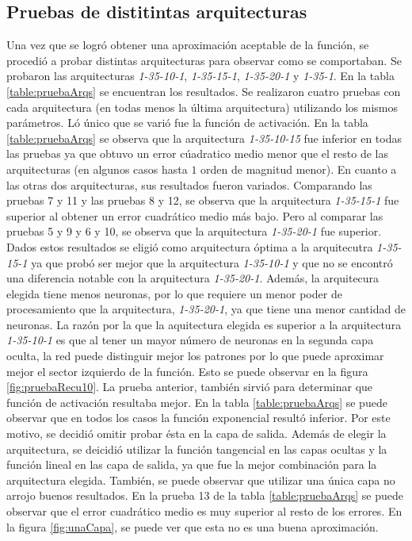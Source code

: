 \documentclass[11pt,a4paper]{article}
\begin{document}
\subsection{Pruebas de distitintas arquitecturas}


Una vez que se logró obtener una aproximación aceptable de la función, se procedió a probar distintas arquitecturas para observar como se comportaban. Se probaron las arquitecturas \emph{1-35-10-1}, \emph{1-35-15-1}, \emph{1-35-20-1} y \emph{1-35-1}. En la tabla \ref{table:pruebaArqs} se encuentran los resultados. Se realizaron cuatro pruebas con cada arquitectura (en todas menos la última arquitectura) utilizando los mismos parámetros. Ló único que se varió fue la función de activación. En la tabla \ref{table:pruebaArqs} se observa que la arquitectura \emph{1-35-10-15} fue inferior en todas las pruebas ya que obtuvo un error cúadratico medio menor que el resto de las arquitecturas (en algunos casos hasta $1$ orden de magnitud menor). En cuanto a las otras dos arquitecturas, sus resultados fueron variados. Comparando las pruebas 7 y 11 y las pruebas 8 y 12, se observa que la arquitectura \emph{1-35-15-1} fue superior al obtener un error cuadrático medio más bajo. Pero al comparar las pruebas 5 y 9 y 6 y 10, se observa que la arquitectura \emph{1-35-20-1} fue superior. Dados estos resultados se eligió como arquitectura óptima a la arquitecutra \emph{1-35-15-1} ya que probó ser mejor que la arquitectura \emph{1-35-10-1} y que no se encontró una diferencia notable con la arquitectura \emph{1-35-20-1}. Además, la arquitecura elegida tiene menos neuronas, por lo que requiere un menor poder de procesamiento que la arquitectura, \emph{1-35-20-1}, ya que tiene una menor cantidad de neuronas. La razón por la que la aquitectura elegida es superior a la arquitectura \emph{1-35-10-1} es que al tener un mayor número de neuronas en la segunda capa oculta, la red puede distinguir mejor los patrones por lo que puede aproximar mejor el sector izquierdo de la función. Esto se puede observar en la figura \ref{fig:pruebaRecu10}. La prueba anterior, también sirvió para determinar que función de activación resultaba mejor. En la tabla \ref{table:pruebaArqs} se puede observar que en todos los casos la función exponencial resultó inferior. Por este motivo, se decidió omitir probar ésta en la capa de salida. Además de elegir la arquitectura, se deicidió utilizar la función tangencial en las capas ocultas y la función lineal en las capa de salida, ya que fue la mejor combinación para la arquitectura elegida. También, se puede observar que utilizar una única capa no arrojo buenos resultados. En la prueba 13 de la tabla \ref{table:pruebaArqs} se puede observar que el error cuadrático medio es muy superior al resto de los errores. En la figura \ref{fig:unaCapa}, se puede ver que esta no es una buena aproximación.
\end{document}
